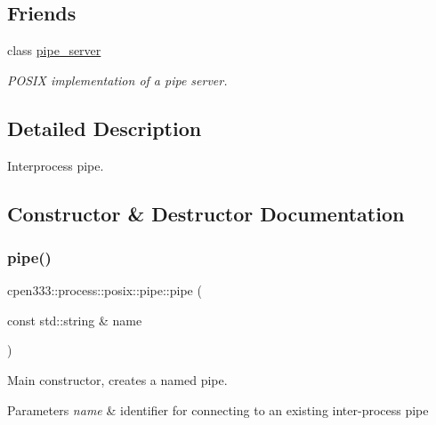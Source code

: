 \subsection*{Friends}
\begin{DoxyCompactItemize}
\item 
class \hyperlink{classcpen333_1_1process_1_1posix_1_1pipe_ab111e84ef31179e72c2bd2e58e2042b0}{pipe\+\_\+server}
\begin{DoxyCompactList}\small\item\em P\+O\+S\+IX implementation of a pipe server. \end{DoxyCompactList}\end{DoxyCompactItemize}


\subsection{Detailed Description}
Interprocess pipe. 

\subsection{Constructor \& Destructor Documentation}
\mbox{\label{classcpen333_1_1process_1_1posix_1_1pipe_ac39ea29cbd5084681acde6b02b27bf91}} 
\subsubsection{\texorpdfstring{pipe()}{pipe()}\hspace{0.1cm}{\footnotesize\ttfamily [1/2]}}
{\footnotesize\ttfamily cpen333\+::process\+::posix\+::pipe\+::pipe (\begin{DoxyParamCaption}\item[{const std\+::string \&}]{name }\end{DoxyParamCaption})\hspace{0.3cm}{\ttfamily [inline]}}



Main constructor, creates a named pipe. 


\begin{DoxyParams}{Parameters}
{\em name} & identifier for connecting to an existing inter-\/process pipe \\
\hline
\end{DoxyParams}
\mbox{\label{classcpen333_1_1process_1_1posix_1_1pipe_a0ee8e36b323420d783fdbcf253225677}} 

